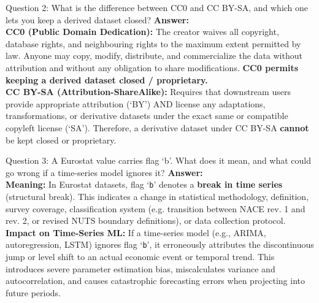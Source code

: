 \documentclass[11pt,a4paper]{article}
\begin{document}
\begin{testbox}{Question 2: What is the difference between CC0 and CC BY-SA, and which one lets you keep a derived dataset closed?}
\textbf{Answer:}\\
\textbf{CC0 (Public Domain Dedication):} The creator waives all copyright, database rights, and neighbouring rights to the maximum extent permitted by law. Anyone may copy, modify, distribute, and commercialize the data without attribution and without any obligation to share modifications. \textbf{CC0 permits keeping a derived dataset closed / proprietary.}\\
\textbf{CC BY-SA (Attribution-ShareAlike):} Requires that downstream users provide appropriate attribution (`BY') AND license any adaptations, transformations, or derivative datasets under the exact same or compatible copyleft license (`SA'). Therefore, a derivative dataset under CC BY-SA \textbf{cannot} be kept closed or proprietary.
\end{testbox}

\begin{testbox}{Question 3: A Eurostat value carries flag `b'. What does it mean, and what could go wrong if a time-series model ignores it?}
\textbf{Answer:}\\
\textbf{Meaning:} In Eurostat datasets, flag `\texttt{b}' denotes a \textbf{break in time series} (structural break). This indicates a change in statistical methodology, definition, survey coverage, classification system (e.g. transition between NACE rev. 1 and rev. 2, or revised NUTS boundary definitions), or data collection protocol.\\
\textbf{Impact on Time-Series ML:} If a time-series model (e.g., ARIMA, autoregression, LSTM) ignores flag `\texttt{b}', it erroneously attributes the discontinuous jump or level shift to an actual economic event or temporal trend. This introduces severe parameter estimation bias, miscalculates variance and autocorrelation, and causes catastrophic forecasting errors when projecting into future periods.
\end{testbox}
\end{document}
